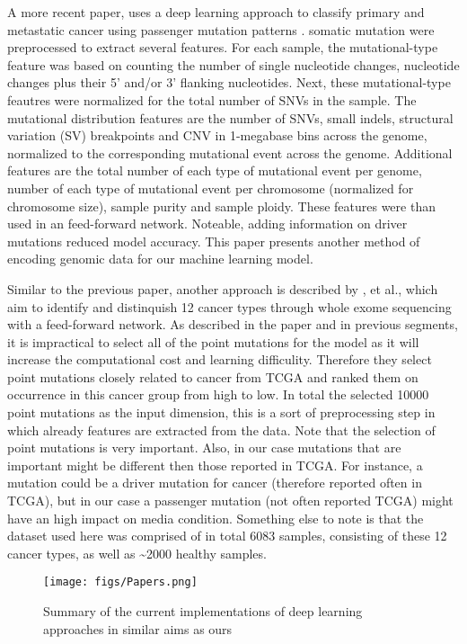\documentclass[11pt,]{article}
\begin{document}
A more recent paper, uses a deep learning approach to classify primary
and metastatic cancer using passenger mutation patterns
\citep{Jiao2020}. somatic mutation were preprocessed to extract several
features. For each sample, the mutational-type feature was based on
counting the number of single nucleotide changes, nucleotide changes
plus their 5' and/or 3' flanking nucleotides. Next, these
mutational-type feautres were normalized for the total number of SNVs in
the sample. The mutational distribution features are the number of SNVs,
small indels, structural variation (SV) breakpoints and CNV in
1-megabase bins across the genome, normalized to the corresponding
mutational event across the genome. Additional features are the total
number of each type of mutational event per genome, number of each type
of mutational event per chromosome (normalized for chromosome size),
sample purity and sample ploidy. These features were than used in an
feed-forward network. Noteable, adding information on driver mutations
reduced model accuracy. This paper presents another method of encoding
genomic data for our machine learning model.

Similar to the previous paper, another approach is described by
\citet{Sun2019}, et al., which aim to identify and distinquish 12 cancer
types through whole exome sequencing with a feed-forward network. As
described in the paper and in previous segments, it is impractical to
select all of the point mutations for the model as it will increase the
computational cost and learning difficulity. Therefore they select point
mutations closely related to cancer from TCGA and ranked them on
occurrence in this cancer group from high to low. In total the selected
10000 point mutations as the input dimension, this is a sort of
preprocessing step in which already features are extracted from the
data. Note that the selection of point mutations is very important.
Also, in our case mutations that are important might be different then
those reported in TCGA. For instance, a mutation could be a driver
mutation for cancer (therefore reported often in TCGA), but in our case
a passenger mutation (not often reported TCGA) might have an high impact
on media condition. Something else to note is that the dataset used here
was comprised of in total 6083 samples, consisting of these 12 cancer
types, as well as \textasciitilde{}2000 healthy samples.

\begin{figure}
\centering
\texttt{[image: figs/Papers.png]}
\caption{Summary of the current implementations of deep learning
approaches in similar aims as ours}
\end{figure}
\end{document}
